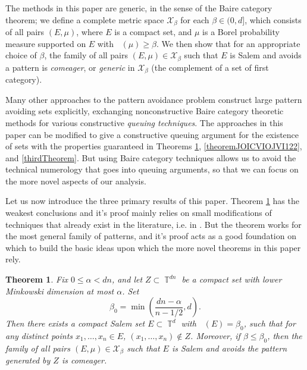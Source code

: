 \documentclass[dvipsnames,letterpaper,12pt]{article}
\numberwithin{equation}{section}
\DeclareMathOperator{\fordim}{\dim_{\mathbb{F}}}
\DeclareMathOperator{\TT}{\mathbb{T}}
\newtheorem{theorem}{Theorem}
\numberwithin{theorem}{section}
\begin{document}
The methods in this paper are generic, in the sense of the Baire category theorem; we define a complete metric space $\mathcal{X}_\beta$ for each $\beta \in (0,d]$, which consists of all pairs $(E,\mu)$, where $E$ is a compact set, and $\mu$ is a Borel probability measure supported on $E$ with $\fordim(\mu) \geq \beta$. We then show that for an appropriate choice of $\beta$, the family of all pairs $(E,\mu) \in \mathcal{X}_\beta$ such that $E$ is Salem and avoids a pattern is \emph{comeager}, or \emph{generic} in $\mathcal{X}_\beta$ (the complement of a set of first category).

Many other approaches \cite{OurPaper,PramanikFraser,Keleti} to the pattern avoidance problem construct large pattern avoiding sets explicitly, exchanging nonconstructive Baire category theoretic methods for various constructive \emph{queuing techniques}. The approaches in this paper can be modified to give a constructive queuing argument for the existence of sets with the properties guaranteed in Theorems \ref{maintheorem}, \ref{theoremJOICVIOJVI122}, and \ref{thirdTheorem}. But using Baire category techniques allows us to avoid the technical numerology that goes into queuing arguments, so that we can focus on the more novel aspects of our analysis.



Let us now introduce the three primary results of this paper. Theorem \ref{maintheorem} has the weakest conclusions and it's proof mainly relies on small modifications of techniques that already exist in the literature, i.e. in \cite{Korner1}. But the theorem works for the most general family of patterns, and it's proof acts as a good foundation on which to build the basic ideas upon which the more novel theorems in this paper rely.

\begin{theorem} \label{maintheorem}
    Fix $0 \leq \alpha < dn$, and let $Z \subset \TT^{dn}$ be a compact set with lower Minkowski dimension at most $\alpha$. Set
    \[ \beta_0 = \min \left( \frac{dn - \alpha}{n-1/2}, d \right). \]
    Then there exists a compact Salem set $E \subset \TT^d$ with $\fordim(E) = \beta_0$, such that for any distinct points $x_1, \dots, x_n \in E$, $(x_1, \dots, x_n) \not \in Z$. Moreover, if $\beta \leq \beta_0$, then the family of all pairs $(E,\mu) \in \mathcal{X}_\beta$ such that $E$ is Salem and avoids the pattern generated by $Z$ is comeager.
\end{theorem}
\end{document}

